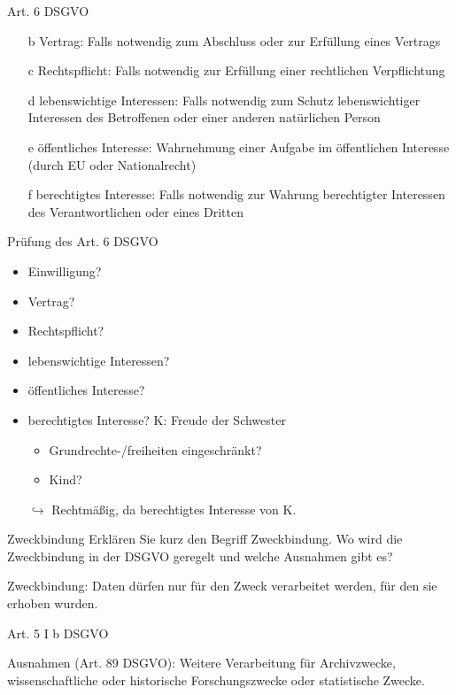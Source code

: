 \documentclass{article}
\begin{document}
\begin{solutions}
  \item Art. 6 DSGVO
  \begin{itemize}
    \item[b] Vertrag: Falls notwendig zum Abschluss oder zur Erfüllung eines Vertrags
    \item[c] Rechtspflicht: Falls notwendig zur Erfüllung einer rechtlichen Verpflichtung
    \item[d] lebenswichtige Interessen: Falls notwendig zum Schutz lebenswichtiger Interessen des Betroffenen oder einer anderen natürlichen Person
    \item[e] öffentliches Interesse: Wahrnehmung einer Aufgabe im öffentlichen Interesse (durch EU oder Nationalrecht)
    \item[f] berechtigtes Interesse: Falls notwendig zur Wahrung berechtigter Interessen des Verantwortlichen oder eines Dritten
  \end{itemize}
  \item Prüfung des Art. 6 DSGVO
  \begin{itemize}
    \item Einwilligung? \xmark
    \item Vertrag? \xmark
    \item Rechtspflicht? \xmark
    \item lebenswichtige Interessen? \xmark
    \item öffentliches Interesse? \xmark
    \item berechtigtes Interesse? K: Freude der Schwester \checkmark
          \begin{itemize}
            \item Grundrechte-/freiheiten eingeschränkt? \xmark
            \item Kind? \xmark
          \end{itemize}
    \item[$\hookrightarrow$] Rechtmäßig, da berechtigtes Interesse von K.
  \end{itemize}
\end{solutions}

\begin{exercise}{Zweckbindung}
  Erklären Sie kurz den Begriff Zweckbindung. Wo wird die Zweckbindung in der DSGVO geregelt und welche Ausnahmen gibt es?

  \begin{solution}
    Zweckbindung: Daten dürfen nur für den Zweck verarbeitet werden, für den sie erhoben wurden.\par
    Art. 5 I b DSGVO\par
    Ausnahmen (Art. 89 DSGVO): Weitere Verarbeitung für Archivzwecke, wissenschaftliche oder historische Forschungszwecke oder statistische Zwecke.
  \end{solution}
\end{exercise}
\end{document}

